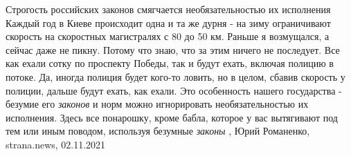 Строгость российских законов смягчается необязательностью их исполнения
Каждый год в Киеве происходит одна и та же дурня - на зиму ограничивают
скорость на скоростных магистралях с 80 до 50 км. Раньше я возмущался, а сейчас
даже не пикну. Потому что знаю, что за этим ничего не последует. Все как ехали
сотку по проспекту Победы, так и будут ехать, включая полицию в потоке. Да,
иногда полиция будет кого-то ловить, но в целом, сбавив скорость у полиции,
дальше будут ехать, как ехали.  Это особенность нашего государства - безумие
его \emph{законов} и норм можно игнорировать необязательностью их исполнения.
Здесь все понарошку, кроме бабла, которое у вас вытягивают под тем или иным
поводом, используя безумные \emph{законы}
, 
Юрий Романенко, strana.news, 02.11.2021
